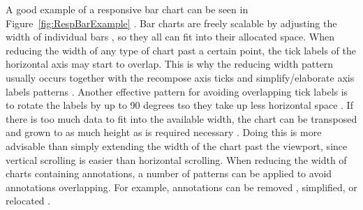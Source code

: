 A good example of a responsive bar chart can be seen in
Figure~\ref{fig:RespBarExample} \parencite{RespVis}. Bar charts are
freely scalable by adjusting the width of individual bars
\parencite{RespHBar,RespHBarHLine,RespHBars}, so they all can fit into
their allocated space. When reducing the width of any type of chart
past a certain point, the tick labels of the horizontal axis may start
to overlap. This is why the reducing width pattern usually occurs
together with the recompose axis ticks and simplify/elaborate axis
labels patterns \parencite{RespHBars,RespHBarHLine,RespVBar}. Another
effective pattern for avoiding overlapping tick labels is to rotate
the labels by up to 90 degrees tso they take up less horizontal space
\parencite{RespVis}. If there is too much data to fit into the
available width, the chart can be transposed and grown to as much
height as is required necessary \parencite{RespVis}. Doing this is
more advisable than simply extending the width of the chart past the
viewport, since vertical scrolling is easier than horizontal
scrolling. When reducing the width of charts containing annotations, a
number of patterns can be applied to avoid annotations
overlapping. For example, annotations can be removed
\parencite{RespHStackedBar,RespHLineHStackedBar}, simplified, or
relocated \parencite{RespVBar}.



